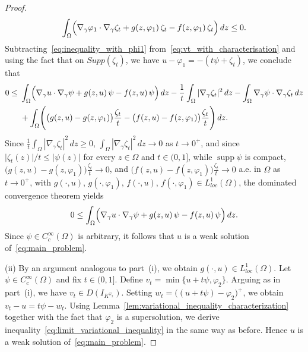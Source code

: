 \documentclass[11pt]{article}
\newcommand{\om} {\Omega}
\newcommand{\gradgr}{\nabla_{\gamma}}
\begin{document}
\begin{proof}
\begin{equation}
\label{eq:inequality_with_phi1}
\int_{\Omega} \Bigl( \gradgr \varphi_1 \cdot \gradgr \zeta_t + g(z,\varphi_1)\, \zeta_t - f(z,\varphi_1)\, \zeta_t \Bigr)\, dz \le 0 .
\end{equation}
Subtracting~\eqref{eq:inequality_with_phi1} from~\eqref{eq:vt_with_characterisation} and using the fact that on $Supp(\zeta_t)$, we have $u - \varphi_1 = - (t \psi + \zeta_t)$, we conclude that
\begin{equation*}
\begin{aligned}
0 \le {} &
\int_{\Omega} \Bigl( \gradgr u \cdot \gradgr \psi + g(z,u)\, \psi - f(z,u)\, \psi \Bigr)\, dz
- \frac{1}{t}\int_{\Omega} |\gradgr \zeta_t|^{2}\, dz- \int_{\Omega} \gradgr \psi \cdot \gradgr \zeta_t \, dz \\
& {} + \int_{\Omega} \Biggl( \bigl(g(z,u) - g(z,\varphi_1)\bigr) \frac{\zeta_t}{t}
- \bigl(f(z,u) - f(z,\varphi_1)\bigr) \frac{\zeta_t}{t} \Biggr)\, dz .
\end{aligned}
\end{equation*}
Since $\frac{1}{t}\int_{\Omega} |\gradgr \zeta_t|^{2}\, dz \geq 0$,  $ \int_{\Omega} |\gradgr \zeta_t|^{2}\, dz \to 0$ as $t \to 0^{+}$, and since
$\lvert \zeta_t(z) \rvert / t \le \lvert \psi(z) \rvert$ for every $z \in \Omega$ and $t \in (0,1]$, while
$\operatorname{supp} \psi$ is compact, $\bigl(g(z,u) - g(z,\varphi_1)\bigr)\frac{\zeta_t}{t} \to 0$, and $\bigl(f(z,u) - f(z,\varphi_1)\bigr)\frac{\zeta_t}{t} \to 0$ a.e. in $\om$ as $t\to 0^+$, 
with $g(\cdot,u)$, $g(\cdot,\varphi_1)$, $f(\cdot,u)$, $f(\cdot,\varphi_1) \in L_{loc}^{1}(\Omega)$, the dominated convergence theorem yields
\begin{equation}
\label{eq:limit_variational_inequality}
0 \le \int_{\Omega} \Bigl( \gradgr u \cdot \gradgr \psi + g(z,u)\, \psi - f(z,u)\, \psi \Bigr)\, dz .
\end{equation}
Since $\psi \in C_c^{\infty}(\Omega)$ is arbitrary, it follows that $u$ is a weak solution of~\eqref{eq:main_problem}.


\textnormal{(ii)} By an argument analogous to part~\textnormal{(i)}, we obtain $g(\cdot,u) \in L_{loc}^{1}(\Omega)$. 
Let $\psi \in C_c^{\infty}(\Omega)$ and fix $t \in (0,1]$. Define $v_t = \min\{u + t\psi, \varphi_2\}$. Arguing as in part~\textnormal{(i)}, we have $v_t \in D(I_{K^{\varphi_2}})$. Setting $w_t = \bigl( (u + t\psi) - \varphi_2 \bigr)^{+}$, we obtain $v_t - u = t\psi - w_t$. 
Using Lemma~\ref{lem:variational_inequality_characterization} together with the fact that $\varphi_2$ is a supersolution, we derive inequality~\eqref{eq:limit_variational_inequality} in the same way as before. Hence $u$ is a weak solution of~\eqref{eq:main_problem}.


\end{proof}
\end{document}
